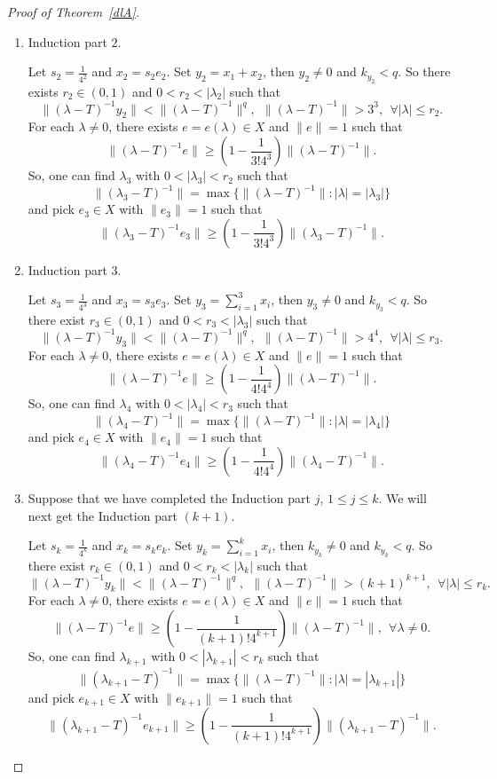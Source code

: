 \documentclass[12pt]{amsart}
\numberwithin{equation}{section}
\theoremstyle{plain}
\theoremstyle{definition}
\begin{document}
\begin{proof}[Proof of Theorem~\ref{dlA}]
\begin{enumerate}
  \item [(2)] Induction part $2$.

  Let $s_2=\frac{1}{4^2}$ and $x_2=s_2e_2$.
  Set $y_2=x_1+x_2$, then $y_2\neq 0$ and $k_{y_2}<q$.
  So there exists $r_2\in(0,1)$ and $0<r_2<|\lambda_2|$ such that
  $$\|(\lambda-T)^{-1}y_2\|<\|(\lambda-T)^{-1}\|^q,\ \  \|(\lambda-T)^{-1}\|>3^3,\ \
  \forall |\lambda|\leq r_2.$$
  For each $\lambda\neq 0$, there exists $e=e(\lambda)\in X$ and $\|e\|=1$ such that
  $$\|(\lambda-T)^{-1}e\|\geq (1-\frac{1}{3!4^3})\|(\lambda-T)^{-1}\|.$$
  So, one can find $\lambda_3$ with $0<|\lambda_3|<r_2$ such that
  $$\|(\lambda_3-T)^{-1}\|=\max\{\|(\lambda-T)^{-1}\|:|\lambda|=|\lambda_3|\}$$
  and pick $e_3\in X$ with $\|e_3\|=1$ such that
  $$\|(\lambda_3-T)^{-1}e_3\|\geq(1-\frac{1}{3!4^3})\|(\lambda_3-T)^{-1}\|.$$

  \item [(3)] Induction part $3$.

  Let $s_3=\frac{1}{4^3}$ and $x_3=s_3e_3$.
  Set $y_3=\sum_{i=1}^{3}x_i$, then $y_3\neq 0$ and $k_{y_3}<q$.
  So there exist $r_3\in(0,1)$ and $0<r_3<|\lambda_3|$ such that
  $$\|(\lambda-T)^{-1}y_3\|<\|(\lambda-T)^{-1}\|^q, \ \
  \|(\lambda-T)^{-1}\|>4^4, \ \
  \forall |\lambda|\leq r_3.$$
  For each $\lambda\neq 0$, there exists $e=e(\lambda)\in X$ and $\|e\|=1$ such that
  $$\|(\lambda-T)^{-1}e\|\geq (1-\frac{1}{4!4^4})\|(\lambda-T)^{-1}\|.$$
  So, one can find $\lambda_4$ with $0<|\lambda_4|<r_3$ such that
  $$\|(\lambda_4-T)^{-1}\|=\max\{\|(\lambda-T)^{-1}\|:|\lambda|=|\lambda_4|\}$$
  and pick $e_{4}\in X$ with $\|e_4\|=1$ such that
  $$\|(\lambda_4-T)^{-1}e_4\|\geq(1-\frac{1}{4!4^4})\|(\lambda_4-T)^{-1}\|.$$

  \item [(4)]
  Suppose that we have completed the Induction part $j$, $1 \leq j \leq k$. We will next get the Induction part $(k+1)$.

  Let $s_k=\frac{1}{4^k}$ and $x_k=s_ke_k$.
  Set $y_k=\sum_{i=1}^{k}x_i$, then $k_{y_k}\neq 0$ and $k_{y_k}<q$.
  So there exist $r_k\in(0,1)$ and $0<r_k<|\lambda_k|$ such that
  $$\|(\lambda-T)^{-1}y_k\|<\|(\lambda-T)^{-1}\|^q,\ \ \|(\lambda-T)^{-1}\|>(k+1)^{k+1},
  \ \ \forall |\lambda|\leq r_{k}.$$
  For each $\lambda\neq 0$, there exists $e=e(\lambda)\in X$ and $\|e\|=1$ such that
  $$\|(\lambda-T)^{-1}e\|\geq (1-\frac{1}{(k+1)!4^{k+1}})\|(\lambda-T)^{-1}\|,\ \ \forall \lambda\neq 0.$$
  So, one can find $\lambda_{k+1}$ with $0<|\lambda_{k+1}|<r_k$ such that
  $$\|(\lambda_{k+1}-T)^{-1}\|=\max\{\|(\lambda-T)^{-1}\|:|\lambda|=|\lambda_{k+1}|\}$$
  and pick $e_{k+1}\in X$ with $\|e_{k+1}\|=1$ such that
  $$\|(\lambda_{k+1}-T)^{-1}e_{k+1}\|\geq(1-\frac{1}{(k+1)!4^{k+1}})\|(\lambda_{k+1}-T)^{-1}\|.$$


\end{enumerate}
\end{proof}
\end{document}
